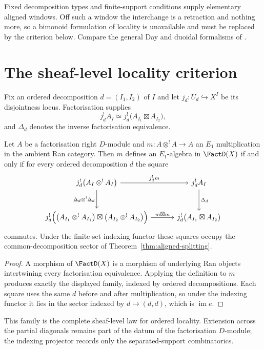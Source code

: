 Fixed decomposition types and finite-support conditions supply elementary
aligned windows. Off such a window the interchange is a retraction and
nothing more, so a bimonoid formulation of locality is unavailable and
must be replaced by the criterion below. Compare the general Day and
duoidal formalisms of \cite{Tor25}.

\section{The sheaf-level locality criterion}

Fix an ordered decomposition $d=(I_1,I_2)$ of $I$ and let $j_d\colon
U_d\hookrightarrow X^I$ be its disjointness locus. Factorisation supplies
\[
  j_d^!A_I \simeq j_d^!\bigl(A_{I_1}\boxtimes A_{I_2}\bigr),
\]
and $\Delta_d$ denotes the inverse factorisation equivalence.

\begin{theorem}
\label{thm:locality}
\StatusProved{} Let $A$ be a factorisation right $D$-module and
$m\colon A\otimes^! A\to A$ an $E_1$ multiplication in the ambient Ran
category. Then $m$ defines an $E_1$-algebra in $\FactD(X)$ if and only if
for every ordered decomposition $d$ the square
\[
\begin{tikzcd}[column sep=3.2em, row sep=2.6em]
j_d^!\bigl(A_I\otimes^! A_I\bigr)
  \arrow[r, "j_d^!m"]
  \arrow[d, "\Delta_d\otimes^!\Delta_d"']
& j_d^!A_I \arrow[d, "\Delta_d"] \\
j_d^!\Bigl(\bigl(A_{I_1}\otimes^! A_{I_1}\bigr)\boxtimes
           \bigl(A_{I_2}\otimes^! A_{I_2}\bigr)\Bigr)
  \arrow[r, "m\boxtimes m"]
& j_d^!\bigl(A_{I_1}\boxtimes A_{I_2}\bigr)
\end{tikzcd}
\]
commutes. Under the finite-set indexing functor these squares occupy the
common-decomposition sector of Theorem~\ref{thm:aligned-splitting}.
\end{theorem}

\begin{proof}
A morphism of $\FactD(X)$ is a morphism of underlying Ran objects
intertwining every factorisation equivalence. Applying the definition to
$m$ produces exactly the displayed family, indexed by ordered
decompositions. Each square uses the same $d$ before and after
multiplication, so under the indexing functor it lies in the sector
indexed by $d\mapsto(d,d)$, which is $\operatorname{im}e$.
\end{proof}

This family is the complete sheaf-level law for ordered locality.
Extension across the partial diagonals remains part of the datum of the
factorisation $D$-module; the indexing projector records only the
separated-support combinatorics.
